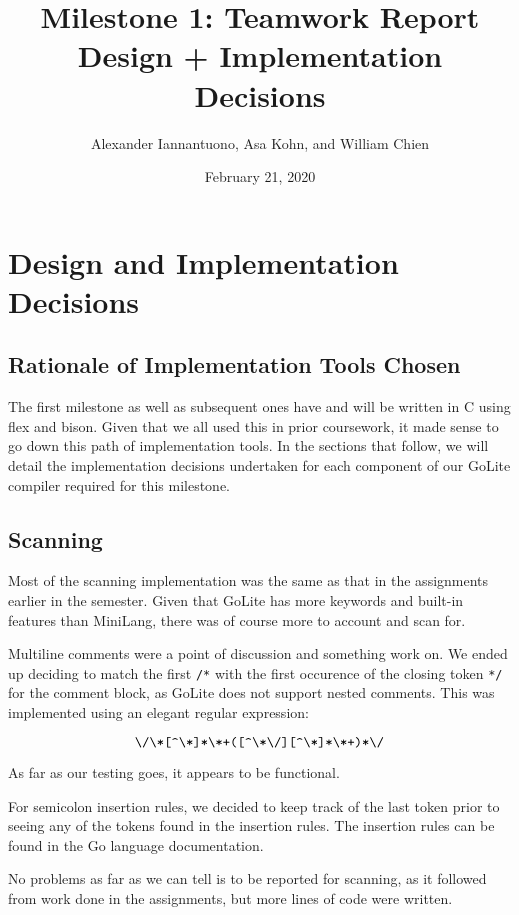 \documentclass{article}
\title{
    Milestone 1: Teamwork Report\\
    \large Design + Implementation Decisions
}
\author{Alexander Iannantuono, Asa Kohn, and William Chien}
\date{February 21, 2020}
\begin{document}
\maketitle

\section{Design and Implementation Decisions}

\subsection{Rationale of Implementation Tools Chosen}

The first milestone as well as subsequent ones have and will be written in C
using flex and bison. Given that we all used this in prior coursework, it made
sense to go down this path of implementation tools. In the sections
that follow, we will detail the implementation decisions undertaken for each
component of our GoLite compiler required for this milestone.

\subsection{Scanning}

Most of the scanning implementation was the same as that in the assignments
earlier in the semester. Given that GoLite has more keywords and built-in
features than MiniLang, there was of course more to account and scan for.

Multiline comments were a point of discussion and something work on. We ended up deciding
to match the first \verb|/*| with the first occurence of the closing token \verb|*/|
for the comment block, as GoLite does not support nested comments.
This was implemented using an elegant regular expression:

\[
    \verb|\/\*[^\*]*\*+([^\*\/][^\*]*\*+)*\/|
\]

As far as our testing goes, it appears to be functional.

For semicolon insertion rules, we decided to keep track of the last token prior
to seeing any of the tokens found in the insertion rules. The insertion rules can be found in
the Go language documentation\cite{gosemi}.

No problems as far as we can tell is to be reported for scanning, as it followed
from work done in the assignments, but more lines of code were written.

\end{document}
